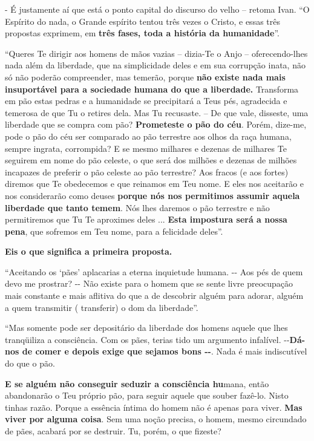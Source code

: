 - É justamente aí que está o ponto capital do discurso do velho --
retoma Ivan. ``O Espírito do nada, o Grande espírito tentou três vezes o
Cristo, e essas três propostas exprimem, em \textbf{três fases, toda a
história da humanidade}''.

``Queres Te dirigir aos homens de mãos vazias -- dizia-Te o Anjo --
oferecendo-lhes nada além da liberdade, que na simplicidade deles e em
sua corrupção inata, não só não poderão compreender, mas temerão, porque
\textbf{não existe nada mais insuportável para a sociedade humana do que
a liberdade.} Transforma em pão estas pedras e a humanidade se
precipitará a Teus pés, agradecida e temerosa de que Tu o retires dela.
Mas Tu recusaste. -- De que vale, disseste, uma liberdade que se compra
com pão? \textbf{Prometeste o pão do céu}. Porém, dize-me, pode o pão do
céu ser comparado ao pão terrestre aos olhos da raça humana, sempre
ingrata, corrompida? E se mesmo milhares e dezenas de milhares Te
seguirem em nome do pão celeste, o que será dos milhões e dezenas de
milhões incapazes de preferir o pão celeste ao pão terrestre? Aos fracos
(e aos fortes) diremos que Te obedecemos e que reinamos em Teu nome. E
eles nos aceitarão e nos considerarão como deuses \textbf{porque nós nos
permitimos assumir aquela liberdade que tanto temem}. Nós lhes daremos o
pão terrestre e não permitiremos que Tu Te aproximes deles ...
\textbf{Esta impostura será a nossa pena}, que sofremos em Teu nome,
para a felicidade deles''.

\textbf{Eis o que significa a primeira proposta.}

``Aceitando os `pães' aplacarias a eterna inquietude humana. -\/- Aos
pés de quem devo me prostrar? -\/- Não existe para o homem que se sente
livre preocupação mais constante e mais aflitiva do que a de descobrir
alguém para adorar, alguém a quem transmitir ( transferir) o dom da
liberdade''.

``Mas somente pode ser depositário da liberdade dos homens aquele que
lhes tranqüiliza a consciência. Com os pães, terias tido um argumento
infalível. -\/-\textbf{Dá-nos de comer e depois exige que sejamos bons
-\/-}. Nada é mais indiscutível do que o pão.

\textbf{E se alguém não conseguir seduzir a consciência hu}mana, então
abandonarão o Teu próprio pão, para seguir aquele que souber fazê-lo.
Nisto tinhas razão. Porque a essência íntima do homem não é apenas para
viver. \textbf{Mas viver por alguma coisa}. Sem uma noção precisa, o
homem, mesmo circundado de pães, acabará por se destruir. Tu, porém, o
que fizeste?

